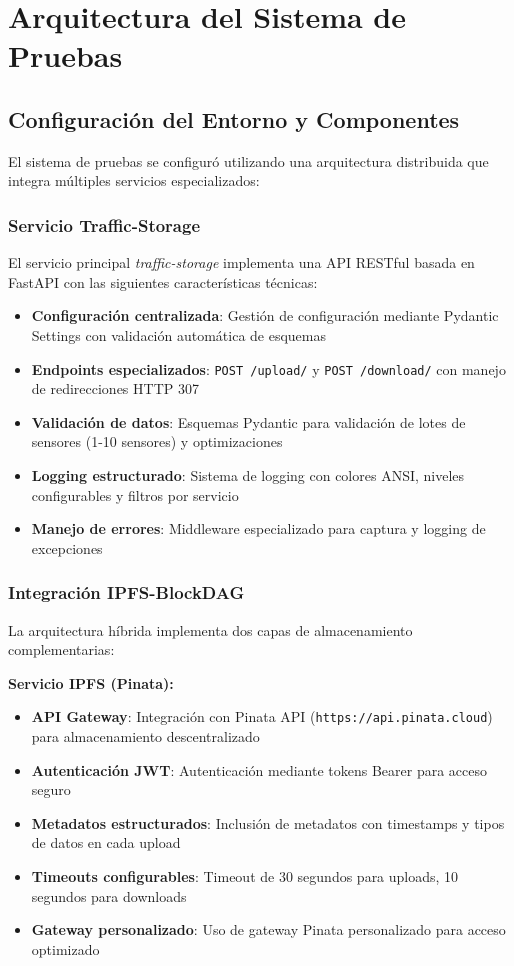 \documentclass[onecolumn]{article}
\begin{document}
\section{Arquitectura del Sistema de Pruebas}

\subsection{Configuración del Entorno y Componentes}

El sistema de pruebas se configuró utilizando una arquitectura distribuida que integra múltiples servicios especializados:

\subsubsection{Servicio Traffic-Storage}

El servicio principal \textit{traffic-storage} implementa una API RESTful basada en FastAPI con las siguientes características técnicas:

\begin{itemize}
    \item \textbf{Configuración centralizada}: Gestión de configuración mediante Pydantic Settings con validación automática de esquemas
    \item \textbf{Endpoints especializados}: \texttt{POST /upload/} y \texttt{POST /download/} con manejo de redirecciones HTTP 307
    \item \textbf{Validación de datos}: Esquemas Pydantic para validación de lotes de sensores (1-10 sensores) y optimizaciones
    \item \textbf{Logging estructurado}: Sistema de logging con colores ANSI, niveles configurables y filtros por servicio
    \item \textbf{Manejo de errores}: Middleware especializado para captura y logging de excepciones
\end{itemize}

\subsubsection{Integración IPFS-BlockDAG}

La arquitectura híbrida implementa dos capas de almacenamiento complementarias:

\textbf{Servicio IPFS (Pinata):}
\begin{itemize}
    \item \textbf{API Gateway}: Integración con Pinata API (\texttt{https://api.pinata.cloud}) para almacenamiento descentralizado
    \item \textbf{Autenticación JWT}: Autenticación mediante tokens Bearer para acceso seguro
    \item \textbf{Metadatos estructurados}: Inclusión de metadatos con timestamps y tipos de datos en cada upload
    \item \textbf{Timeouts configurables}: Timeout de 30 segundos para uploads, 10 segundos para downloads
    \item \textbf{Gateway personalizado}: Uso de gateway Pinata personalizado para acceso optimizado
\end{itemize}
\end{document}
